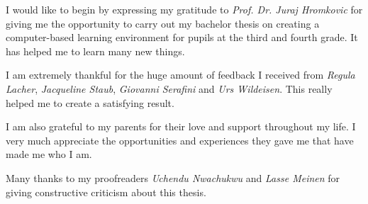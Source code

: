 I would like to begin by expressing my gratitude to \textit{Prof. Dr. Juraj Hromkovic} for giving me the opportunity to carry out my bachelor thesis on creating a computer-based learning environment for pupils at the third and fourth grade. It has helped me to learn many new things.

I am extremely thankful for the huge amount of feedback I received from \textit{Regula Lacher}, \textit{Jacqueline Staub}, \textit{Giovanni Serafini} and \textit{Urs Wildeisen}. This really helped me to create a satisfying result. 

I am also grateful to my parents for their love and support throughout my life. I very much appreciate the opportunities and experiences they gave me that have made me who I am.

Many thanks to my proofreaders \textit{Uchendu Nwachukwu} and \textit{Lasse Meinen} for giving constructive criticism about this thesis.